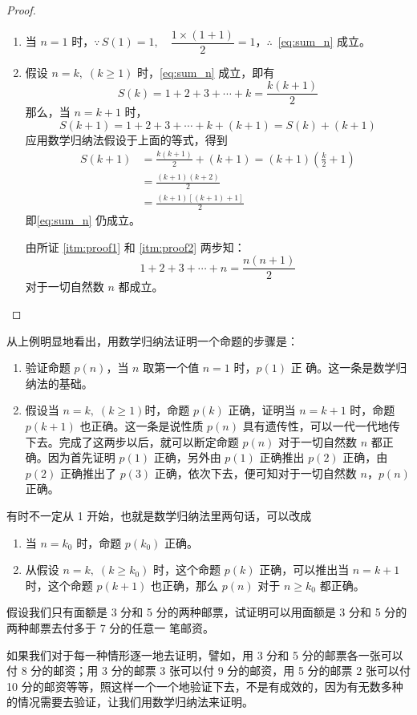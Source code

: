 \begin{proof}
  \begin{enumerate}
    \item\label{itm:proof1} 当 $n=1$ 时，$\because\, S(1)=1,\quad \dfrac{1\times(1+1)}{2}=1$，$\therefore\, $ \cref{eq:sum_n} 成立。
    \item\label{itm:proof2} 假设 $n=k,\; (k\geqslant 1)$ 时，\cref{eq:sum_n} 成立，即有
\[S(k)=1+2+3+\cdots+k=\frac{k(k+1)}{2}\]
那么，当 $n=k+1$ 时，
\[S(k+1)=1+2+3+\cdots+k+(k+1)=S(k)+(k+1)\]
应用数学归纳法假设于上面的等式，得到
\[\begin{split}
    S(k+1)&=\frac{k(k+1)}{2}+(k+1)=(k+1)\left(\frac{k}{2}+1\right)\\
    &=\frac{(k+1)(k+2)}{2}\\
    &=\frac{(k+1)[(k+1)+1]}{2}
\end{split}\]
即\cref{eq:sum_n} 仍成立。

由所证 \ref{itm:proof1} 和 \ref{itm:proof2} 两步知：
\[1+2+3+\cdots+n=\frac{n(n+1)}{2}\]
对于一切自然数 $n$ 都成立。
\end{enumerate}
\end{proof}

从上例明显地看出，用数学归纳法证明一个命题的步骤是：
\begin{enumerate}
\item\label{itm:stp1} 验证命题 $p(n)$，当 $n$ 取第一个值 $n=1$ 时，$p(1)$ 正
确。这一条是数学归纳法的基础。
\item\label{itm:stp2} 假设当 $n=k,\; (k\geqslant 1)$时，命题 $p(k)$ 正确，证明当 $n=k+1$ 时，命题 $p(k+1)$ 也正确。这一条是说性质 $p(n)$ 具有遗传性，可以一代一代地传下去。完成了这两步以后，就可以断定命题 $p(n)$ 对于一切自然数 $n$ 都正确。因为首先证明 $p(1)$ 正确，另外由 $p(1)$ 正确推出 $p(2)$ 正确，由 $p(2)$ 正确推出了 $p(3)$ 正确，依次下去，便可知对于一切自然数 $n$，$p(n)$ 正确。
\end{enumerate}


有时不一定从 1 开始，也就是数学归纳法里两句话，可以改成
\begin{enumerate}
  \item 当 $n=k_0$ 时，命题 $p(k_0)$ 正确。
  \item 从假设 $n=k,\; (k\geqslant k_0)$ 时，这个命题 $p(k)$ 正确，可以推出当 $n=k+1$ 时，这个命题 $p(k+1)$ 也正确，那么 $p(n)$ 对于 $n\geqslant k_0$ 都正确。
\end{enumerate}

\begin{example}
  假设我们只有面额是 3 分和 5 分的两种邮票，试证明可以用面额是 3 分和 5 分的两种邮票去付多于 7 分的任意一
笔邮资。

如果我们对于每一种情形逐一地去证明，譬如，用 3 分和 5 分的邮票各一张可以付 8 分的邮资；用 3 分的邮票 3 张可以付 9 分的邮资，用 5 分的邮票 2 张可以付 10 分的邮资等等，照这样一个一个地验证下去，不是有成效的，因为有无数多种的情况需要去验证，让我们用数学归纳法来证明。
\end{example}

